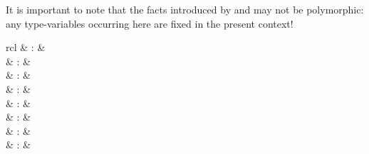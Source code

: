\begin{isabellebody}
\begin{isamarkuptext}
  It is important to note that the facts introduced by \hyperlink{command.obtain}{\mbox{}} and \hyperlink{command.guess}{\mbox{}} may not be polymorphic: any
  type-variables occurring here are fixed in the present context!%
\end{isamarkuptext}%
\isamarkuptrue%
%
\isamarkuptrue%
%
\begin{isamarkuptext}%
\begin{matharray}{rcl}
    \hypertarget{command.also}{\hyperlink{command.also}{\mbox{}}} & : &  \\
    \hypertarget{command.finally}{\hyperlink{command.finally}{\mbox{}}} & : &  \\
    \hypertarget{command.moreover}{\hyperlink{command.moreover}{\mbox{}}} & : &  \\
    \hypertarget{command.ultimately}{\hyperlink{command.ultimately}{\mbox{}}} & : &  \\
    \hypertarget{command.print-trans-rules}{\hyperlink{command.print-trans-rules}{\mbox{}}}\isa{{\isachardoublequote}\isactrlsup {\isacharasterisk}{\isachardoublequote}} & : &  \\
    \hyperlink{attribute.trans}{\mbox{}} & : & \isaratt \\
    \hyperlink{attribute.sym}{\mbox{}} & : & \isaratt \\
    \hyperlink{attribute.symmetric}{\mbox{}} & : & \isaratt \\
  \end{matharray}


\end{isamarkuptext}
\end{isabellebody}
